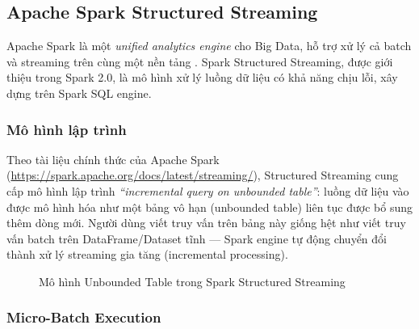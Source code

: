 \subsection{Apache Spark Structured Streaming}

Apache Spark là một \emph{unified analytics engine} cho Big Data, hỗ trợ xử lý
cả batch và streaming trên cùng một nền tảng \cite{zaharia2016spark}. Spark
Structured Streaming, được giới thiệu trong Spark 2.0, là mô hình xử lý luồng dữ
liệu có khả năng chịu lỗi, xây dựng trên Spark SQL engine.

\subsubsection{Mô hình lập trình}

Theo tài liệu chính thức của Apache Spark
(\url{https://spark.apache.org/docs/latest/streaming/}), Structured Streaming cung
cấp mô hình lập trình \emph{``incremental query on unbounded table''}: luồng dữ liệu
vào được mô hình hóa như một bảng vô hạn (unbounded table) liên tục được bổ sung
thêm dòng mới. Người dùng viết truy vấn trên bảng này giống hệt như viết truy vấn
batch trên DataFrame/Dataset tĩnh --- Spark engine tự động chuyển đổi thành xử lý
streaming gia tăng (incremental processing).

\begin{figure}[H]
  \centering
  \setlength{\fboxsep}{12pt}
  \caption{Mô hình Unbounded Table trong Spark Structured Streaming}
  \label{fig:spark-unbounded}
\end{figure}

\subsubsection{Micro-Batch Execution}

